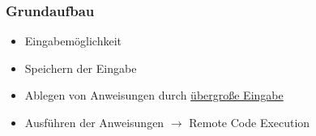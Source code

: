 \begin{frame}
    \frametitle{Grundaufbau}
    \begin{itemize}
        \item Eingabemöglichkeit
        \item Speichern der Eingabe
        \item Ablegen von Anweisungen durch \underline{übergroße Eingabe}  
        \item Ausführen der Anweisungen $\rightarrow$ Remote Code Execution
    \end{itemize}
    
    \end{frame}